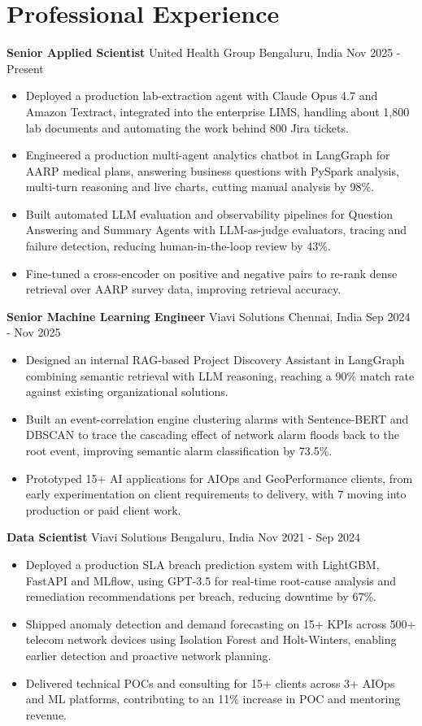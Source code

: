 \documentclass[10pt,a4paper]{article}
\newcommand{\role}[4]{\textbf{#1} \textbar{} #2 \hfill #3 \textbar{} #4\par}
\begin{document}
\section{Professional Experience}
\role{Senior Applied Scientist}{United Health Group}{Bengaluru, India}{Nov 2025 - Present}
\begin{itemize}
  \item Deployed a production lab-extraction agent with Claude Opus 4.7 and Amazon Textract, integrated into the enterprise LIMS, handling about 1,800 lab documents and automating the work behind 800 Jira tickets.
  \item Engineered a production multi-agent analytics chatbot in LangGraph for AARP medical plans, answering business questions with PySpark analysis, multi-turn reasoning and live charts, cutting manual analysis by 98\%.
  \item Built automated LLM evaluation and observability pipelines for Question Answering and Summary Agents with LLM-as-judge evaluators, tracing and failure detection, reducing human-in-the-loop review by 43\%.
  \item Fine-tuned a cross-encoder on positive and negative pairs to re-rank dense retrieval over AARP survey data, improving retrieval accuracy.
\end{itemize}
\vspace{3pt}
\role{Senior Machine Learning Engineer}{Viavi Solutions}{Chennai, India}{Sep 2024 - Nov 2025}
\begin{itemize}
  \item Designed an internal RAG-based Project Discovery Assistant in LangGraph combining semantic retrieval with LLM reasoning, reaching a 90\% match rate against existing organizational solutions.
  \item Built an event-correlation engine clustering alarms with Sentence-BERT and DBSCAN to trace the cascading effect of network alarm floods back to the root event, improving semantic alarm classification by 73.5\%.
  \item Prototyped 15+ AI applications for AIOps and GeoPerformance clients, from early experimentation on client requirements to delivery, with 7 moving into production or paid client work.
\end{itemize}
\vspace{3pt}
\role{Data Scientist}{Viavi Solutions}{Bengaluru, India}{Nov 2021 - Sep 2024}
\begin{itemize}
  \item Deployed a production SLA breach prediction system with LightGBM, FastAPI and MLflow, using GPT-3.5 for real-time root-cause analysis and remediation recommendations per breach, reducing downtime by 67\%.
  \item Shipped anomaly detection and demand forecasting on 15+ KPIs across 500+ telecom network devices using Isolation Forest and Holt-Winters, enabling earlier detection and proactive network planning.
  \item Delivered technical POCs and consulting for 15+ clients across 3+ AIOps and ML platforms, contributing to an 11\% increase in POC and mentoring revenue.
\end{itemize}
\end{document}

